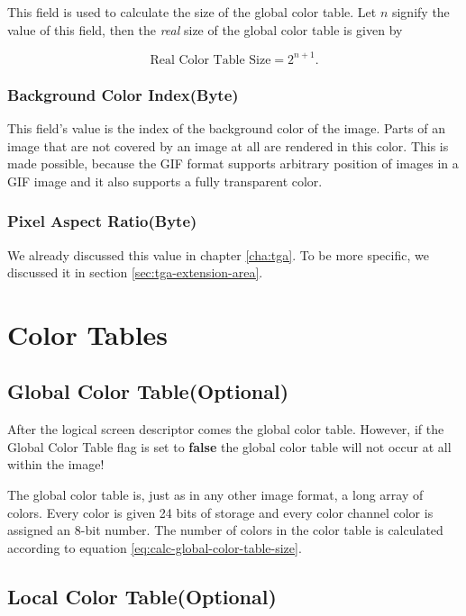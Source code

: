 This field is used to calculate the size of the global color table.
Let $n$ signify the value of this field, then the \textit{real} size
of the global color table is given by

\begin{equation}
  \label{eq:calc-global-color-table-size}
  \text{Real Color Table Size} = 2^{n + 1}.
\end{equation}

\subsubsection{Background Color Index(Byte)}

This field's value is the index of the background color of the
image. Parts of an image that are not covered by an image at all are
rendered in this color. This is made possible, because the GIF format
supports arbitrary position of images in a GIF image and it also
supports a fully transparent color.

\subsubsection{Pixel Aspect Ratio(Byte)}

We already discussed this value in chapter \ref{cha:tga}. To be more
specific, we discussed it in section \ref{sec:tga-extension-area}.

\section{Color Tables}

\subsection{Global Color Table(Optional)}

After the logical screen descriptor comes the global color
table. However, if the Global Color Table flag is set to
\textbf{false} the global color table will not occur at all within
the image!

The global color table is, just as in any other image format, a long
array of colors. Every color is given 24 bits of storage and every
color channel color is assigned an 8-bit number. The number of colors
in the color table is calculated according to equation \ref{eq:calc-global-color-table-size}.

\subsection{Local Color Table(Optional)}

